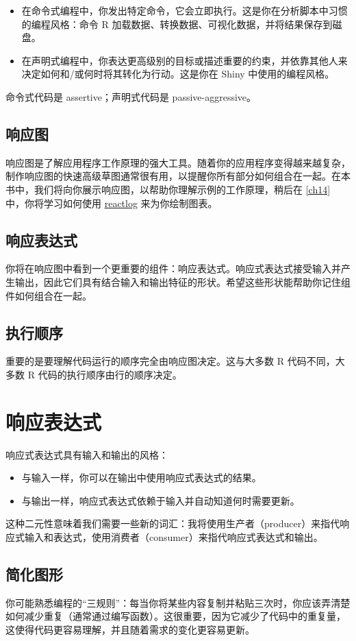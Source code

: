 \begin{itemize}
    \item 在命令式编程中，你发出特定命令，它会立即执行。这是你在分析脚本中习惯的编程风格：命令 R 加载数据、转换数据、可视化数据，并将结果保存到磁盘。
    \item 在声明式编程中，你表达更高级别的目标或描述重要的约束，并依靠其他人来决定如何和/或何时将其转化为行动。这是你在 Shiny 中使用的编程风格。
\end{itemize}
命令式代码是 assertive；声明式代码是 passive-aggressive。
\subsection{响应图}
响应图是了解应用程序工作原理的强大工具。随着你的应用程序变得越来越复杂，制作响应图的快速高级草图通常很有用，以提醒你所有部分如何组合在一起。在本书中，我们将向你展示响应图，以帮助你理解示例的工作原理，稍后在 \autoref{ch14} 中，你将学习如何使用 \href{https://cran.r-project.org/web/packages/reactlog/index.html}{reactlog} 来为你绘制图表。
\subsection{响应表达式}
你将在响应图中看到一个更重要的组件：响应表达式。响应式表达式接受输入并产生输出，因此它们具有结合输入和输出特征的形状。希望这些形状能帮助你记住组件如何组合在一起。
\subsection{执行顺序}
重要的是要理解代码运行的顺序完全由响应图决定。这与大多数 R 代码不同，大多数 R 代码的执行顺序由行的顺序决定。
\section{响应表达式}
响应式表达式具有输入和输出的风格：
\begin{itemize}
    \item 与输入一样，你可以在输出中使用响应式表达式的结果。
    \item 与输出一样，响应式表达式依赖于输入并自动知道何时需要更新。
\end{itemize}
这种二元性意味着我们需要一些新的词汇：我将使用生产者（producer）来指代响应式输入和表达式，使用消费者（consumer）来指代响应式表达式和输出。
\subsection{简化图形}
你可能熟悉编程的“三规则”：每当你将某些内容复制并粘贴三次时，你应该弄清楚如何减少重复（通常通过编写函数）。这很重要，因为它减少了代码中的重复量，这使得代码更容易理解，并且随着需求的变化更容易更新。

